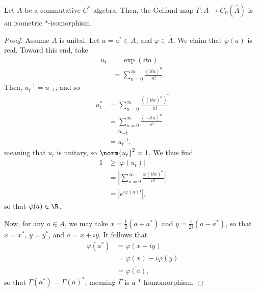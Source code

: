 \documentclass[10pt]{mypackage}
\begin{document}
\begin{theorem}
  Let $A$ be a commutative $C^{\ast}$-algebra. Then, the Gelfand map $\Gamma\colon A\rightarrow C_0(\hat{A})$ is an isometric $\ast$-isomorphism.
\end{theorem}
\begin{proof}
  Assume $A$ is unital. Let $a = a^{\ast}\in A$, and $\varphi\in \hat{A}$. We claim that $\varphi(a)$ is real. Toward this end, take
  \begin{align*}
    u_t &= \exp(ita)\\
        &= \sum_{n=0}^{\infty}\frac{\left( ita \right)^{n}}{n!}.
  \end{align*}
  Then, $u_t^{-1} = u_{-t}$, and so
  \begin{align*}
    u_t^{\ast} &= \sum_{n=0}^{\infty}\frac{\left( \left( ita \right)^{n} \right)^{\ast}}{n!}\\
               &= \sum_{n=0}^{\infty}\frac{\left( -ita \right)^{n}}{n!}\\
               &= u_{-t}\\
               &= u_t^{-1},
  \end{align*}
  meaning that $u_t$ is unitary, so $\norm{u_t}^2 = 1$. We thus find
  \begin{align*}
    1 &\geq \left\vert \varphi\left( u_t \right) \right\vert\\
      &= \left\vert \sum_{n=0}^{\infty} \frac{\varphi\left( ita \right)^{n}}{n!}\right\vert\\
      &= \left\vert e^{i\varphi(a)t} \right\vert,
  \end{align*}
  so that $\varphi(a)\in \R$.

  Now, for any $a\in A$, we may take $x = \frac{1}{2}\left( a+a^{\ast} \right)$ and $y = \frac{1}{2i}\left( a-a^{\ast} \right)$, so that $x = x^{\ast}$, $y=y^{\ast}$, and $a = x + iy$. It follows that
  \begin{align*}
    \varphi\left( a^{\ast} \right) &= \varphi\left( x-iy \right)\\
                                   &= \varphi\left( x \right)-i\varphi\left( y \right)\\
                                   &= \overline{\varphi(a)},
  \end{align*}
  so that $\Gamma\left( a^{\ast} \right) = \Gamma\left(a\right)^{\ast} $, meaning $\Gamma$ is a $\ast$-homomorphism.


\end{proof}
\end{document}
